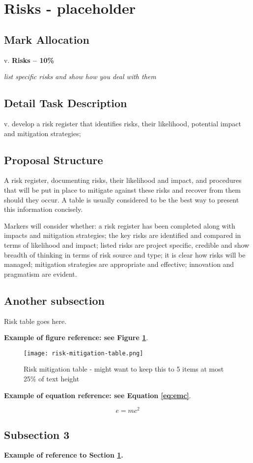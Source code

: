 \section{Risks - placeholder} \label{risks}
\subsection{Mark Allocation}

v. \textbf{Risks -- 10\%}

\textit{list specific risks and show how you deal with them}

\subsection{Detail Task Description} 

v. develop a risk register that identifies risks, their likelihood, potential impact and mitigation strategies;

\subsection{Proposal Structure}

A risk register, documenting risks, their likelihood and impact, and procedures that will be put in place to mitigate against these risks and recover from them should they occur. A table is usually considered to be the best way to present this information concisely.

Markers will consider whether: a risk register has been completed along with impacts and mitigation strategies; the key risks are identified and compared in terms of likelihood and impact; listed risks are project specific, credible and show breadth of thinking in terms of risk source and type; it is clear how risks will be managed; mitigation strategies are appropriate and effective; innovation and pragmatism are evident.

\subsection{Another subsection}

Risk table goes here.

\textbf{Example of figure reference: see Figure \ref{fig:example}}. 
\lipsum[5]

\begin{figure}[ht]
\centering\texttt{[image: risk-mitigation-table.png]}
\caption{Risk mitigation table - might want to keep this to 5 items at most ~ 25\% of text height}
\label{fig:example}
\end{figure}

\textbf{Example of equation reference: see Equation \eqref{eq:emc}}. 
\lipsum[6]

\begin{equation} 
\label{eq:emc}
e = mc^2
\end{equation}

\subsection{Subsection 3}

\textbf{Example of reference to Section \ref{risks}.} 
\lipsum[7]
\lipsum[8]
